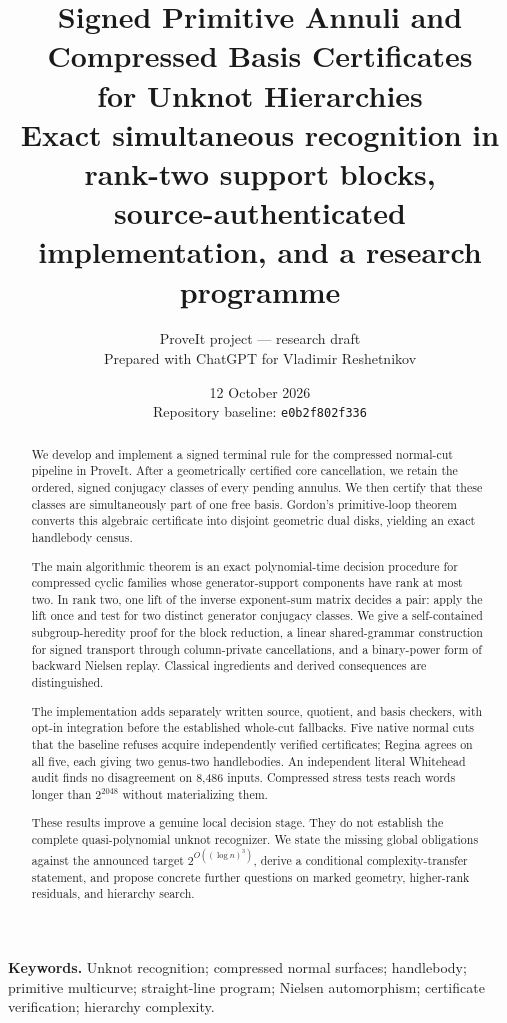 \documentclass[11pt,a4paper]{article}
\title{\vspace{-12mm}\textbf{Signed Primitive Annuli and\\Compressed Basis Certificates\\for Unknot Hierarchies}\\[5mm]
\large Exact simultaneous recognition in rank-two support blocks,\\
source-authenticated implementation, and a research programme}
\author{ProveIt project --- research draft\\
\normalsize Prepared with ChatGPT for Vladimir Reshetnikov}
\date{12 October 2026\\[2mm]\small Repository baseline: \texttt{e0b2f802f336}}
\theoremstyle{definition}
\theoremstyle{remark}
\begin{document}
\maketitle
\begin{abstract}
We develop and implement a signed terminal rule for the compressed normal-cut
pipeline in ProveIt. After a geometrically certified core cancellation, we
retain the ordered, signed conjugacy classes of every pending annulus. We
then certify that these classes are simultaneously part of one free basis.
Gordon's primitive-loop theorem converts this algebraic certificate into
disjoint geometric dual disks, yielding an exact handlebody census.

The main algorithmic theorem is an exact polynomial-time decision procedure
for compressed cyclic families whose generator-support components have rank
at most two. In rank two, one lift of the inverse exponent-sum matrix decides
a pair: apply the lift once and test for two distinct generator conjugacy
classes. We give a self-contained subgroup-heredity proof for the block
reduction, a linear shared-grammar construction for signed transport through
column-private cancellations, and a binary-power form of backward Nielsen
replay. Classical ingredients and derived consequences are distinguished.

The implementation adds separately written source, quotient, and basis
checkers, with opt-in integration before the established whole-cut fallbacks.
Five native normal cuts that the baseline refuses acquire independently
verified certificates; Regina agrees on all five, each giving two genus-two
handlebodies. An independent literal Whitehead audit finds no disagreement
on 8,486 inputs. Compressed stress tests reach words longer than $2^{2048}$
without materializing them.

These results improve a genuine local decision stage. They do not establish
the complete quasi-polynomial unknot recognizer. We state the missing global
obligations against the announced target $2^{O((\log n)^3)}$, derive a
conditional complexity-transfer statement, and propose concrete further
questions on marked geometry, higher-rank residuals, and hierarchy search.
\end{abstract}

\vspace{2mm}
\noindent\textbf{Keywords.} Unknot recognition; compressed normal surfaces;
handlebody; primitive multicurve; straight-line program; Nielsen automorphism;
certificate verification; hierarchy complexity.
\newpage
\tableofcontents
\newpage
\end{document}
